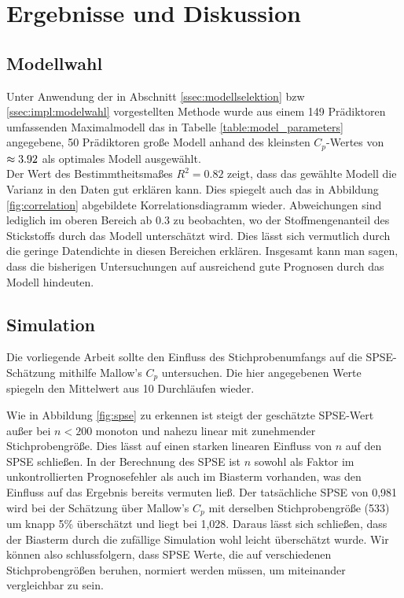\section{Ergebnisse und Diskussion}
\label{sec:discuss}

\subsection{Modellwahl}
\label{ssec:discuss:modelselect}
Unter Anwendung der in Abschnitt \ref{ssec:modellselektion} bzw \ref{ssec:impl:modelwahl} vorgestellten Methode wurde aus einem 149 Prädiktoren umfassenden Maximalmodell das in Tabelle \ref{table:model_parameters} angegebene, 50 Prädiktoren große Modell anhand des kleinsten $C_p$-Wertes von $\mathrm{\approx3.92}$ als optimales Modell ausgewählt.\\

Der Wert des Bestimmtheitsmaßes $R^2 = 0.82$ zeigt, dass das gewählte Modell die Varianz in den Daten gut erklären kann. 
Dies spiegelt auch das in Abbildung \ref{fig:correlation} abgebildete Korrelationsdiagramm wieder.
Abweichungen sind lediglich im oberen Bereich ab $0.3$ zu beobachten, wo der Stoffmengenanteil des Stickstoffs durch das Modell unterschätzt wird.
Dies lässt sich vermutlich durch die geringe Datendichte in diesen Bereichen erklären.
Insgesamt kann man sagen, dass die bisherigen Untersuchungen auf ausreichend gute Prognosen durch das Modell hindeuten.



\subsection{Simulation}
\label{ssec:discuss:simulation}
Die vorliegende Arbeit sollte den Einfluss des Stichprobenumfangs auf die SPSE-Schätzung mithilfe Mallow's $C_p$ untersuchen. Die hier angegebenen Werte spiegeln den Mittelwert aus 10 Durchläufen wieder.



Wie in Abbildung \ref{fig:spse} zu erkennen ist steigt der geschätzte SPSE-Wert außer bei $n < 200$ monoton und nahezu linear mit zunehmender Stichprobengröße. Dies lässt auf einen starken linearen Einfluss von $n$ auf den SPSE schließen. In der Berechnung des SPSE ist $n$ sowohl als Faktor im unkontrollierten Prognosefehler als auch im Biasterm vorhanden, was den Einfluss auf das Ergebnis bereits vermuten ließ.
Der tatsächliche SPSE von 0,981 wird bei der Schätzung über Mallow's $C_p$ mit derselben Stichprobengröße (533) um knapp 5\% überschätzt und liegt bei 1,028. 
Daraus lässt sich schließen, dass der Biasterm durch die zufällige Simulation wohl leicht überschätzt wurde.
Wir können also schlussfolgern, dass SPSE Werte, die auf verschiedenen Stichprobengrößen beruhen, normiert werden müssen, um miteinander vergleichbar zu sein.

